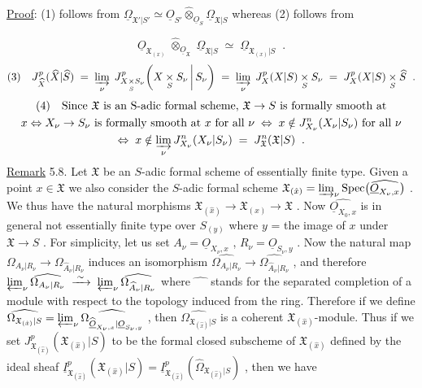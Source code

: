 \underline{Proof}: (1) follows from $\underline{\Omega}_{\mathfrak{X}'|S'} \simeq \underline{O}_{S'} \widehat{\otimes}_{\underline{O}_S} \underline{\Omega}_{\mathfrak{X}|S}$ whereas (2) follows from

\begin{equation*}
\underline{O}_{\mathfrak{X}_{(x)}} \;\widehat{\otimes}_{\underline{O}_{\mathfrak{X}}}\; \underline{\Omega}_{\mathfrak{X}|S} \;\simeq\; \underline{\Omega}_{\mathfrak{X}_{(x)}|S} \;\;.
\end{equation*}
\begin{equation*}
(3)\quad J^{p}_{\widehat{X}}(\widehat{X}|\widehat{S}) \;=\; \varinjlim_{\nu} \; J^{p}_{X \underset{S}{\times} S_\nu}\!\left(X \underset{S}{\times} S_\nu \,\middle|\, S_\nu\right) \;=\; \varinjlim_{\nu} \; J^{p}_{X}(X|S) \underset{S}{\times} S_\nu \;=\; J^{p}_{X}(X|S) \underset{S}{\times} \widehat{S} \;\;.
\end{equation*}
\begin{multline*}
(4)\quad \text{Since } \mathfrak{X} \text{ is an S-adic formal scheme, } \mathfrak{X} \to S \text{ is formally smooth at}\\ x \Leftrightarrow X_\nu \to S_\nu \text{ is formally smooth at } x \text{ for all } \nu \;\Leftrightarrow\; x \notin J^{n}_{X_\nu}(X_\nu|S_\nu) \text{ for all } \nu\\ \Leftrightarrow\; x \notin \varinjlim_{\nu} J^{n}_{X_\nu}(X_\nu|S_\nu) \;=\; J^{n}_{\mathfrak{X}}(\mathfrak{X}|S) \;\;.
\end{multline*}
\underline{Remark} 5.8. Let $\mathfrak{X}$ be an $S$-adic formal scheme of essentially finite type. Given a point $x \in \mathfrak{X}$ we also consider the $S$-adic formal scheme $\mathfrak{X}_{(\hat{x})} = \varinjlim_{\nu} \mathrm{Spec}\big(\widehat{\underline{O}_{X_\nu,x}}\big)$ . We thus have the natural morphisms $\mathfrak{X}_{(\hat{x})} \to \mathfrak{X}_{(x)} \to \mathfrak{X}$ . Now $\widehat{\underline{O}_{X_0,x}}$ is in general not essentially finite type over $S_{(y)}$ where $y$ = the image of $x$ under $\mathfrak{X} \to S$ . For simplicity, let us set $A_\nu = \underline{O}_{X_\nu,x}$ , $R_\nu = \underline{O}_{S_\nu,y}$ . Now the natural map $\Omega_{A_\nu|R_\nu} \to \Omega_{\widehat{A}_\nu|R_\nu}$ induces an isomorphism $\widehat{\Omega_{A_\nu|R_\nu}} \to \widehat{\Omega_{\widehat{A}_\nu|R_\nu}}$ , and therefore $\varprojlim_{\nu} \widehat{\Omega_{A_\nu|R_\nu}} \;\xrightarrow{\;\sim\;}\; \varprojlim_{\nu} \widehat{\Omega_{\widehat{A}_\nu|R_\nu}}$ where $\widehat{\phantom{xx}}$ stands for the separated completion of a module with respect to the topology induced from the ring. Therefore if we define $\widehat{\Omega_{\mathfrak{X}_{(\hat{x})}|S}} = \varprojlim_{\nu} \widehat{\Omega_{\widehat{\underline{O}}_{X_\nu,x}|\underline{O}_{S_\nu,y}}}$ , then $\widehat{\Omega_{\mathfrak{X}_{(\hat{x})}|S}}$ is a coherent $\mathfrak{X}_{(\hat{x})}$-module. Thus if
we set $J^{p}_{\mathfrak{X}_{(\hat{x})}}(\mathfrak{X}_{(\hat{x})}|S)$ to be the formal closed subscheme of $\mathfrak{X}_{(\hat{x})}$ defined by the ideal sheaf $\underline{I}^{p}_{\mathfrak{X}_{(\hat{x})}}(\mathfrak{X}_{(\hat{x})}|S) = \underline{I}^{p}_{\mathfrak{X}_{(\hat{x})}}(\widehat{\Omega}_{\mathfrak{X}_{(\hat{x})}|S})$ , then we have


